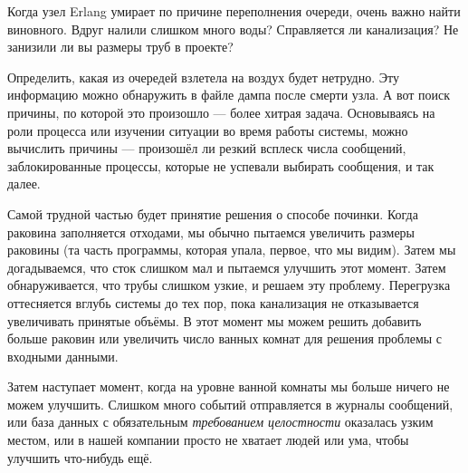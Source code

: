 \documentclass[11pt, oneside]{book}   	%
\begin{document}
Когда узел Erlang умирает по причине переполнения очереди, очень важно найти виновного. Вдруг налили слишком много воды? Справляется ли канализация? Не занизили ли вы размеры труб в проекте?

Определить, какая из очередей взлетела на воздух будет нетрудно. Эту информацию можно обнаружить в файле дампа после смерти узла. А вот поиск причины, по которой это произошло --- более хитрая задача. Основываясь на роли процесса или изучении ситуации во время работы системы, можно вычислить причины --- произошёл ли резкий всплеск числа сообщений, заблокированные процессы, которые не успевали выбирать сообщения, и так далее.

Самой трудной частью будет принятие решения о способе починки. Когда раковина заполняется отходами, мы обычно пытаемся увеличить размеры раковины (та часть программы, которая упала, первое, что мы видим). Затем мы догадываемся, что сток слишком мал и пытаемся улучшить этот момент. Затем обнаруживается, что трубы слишком узкие, и решаем эту проблему. Перегрузка оттесняется вглубь системы до тех пор, пока канализация не отказывается увеличивать принятые объёмы. В этот момент мы можем решить добавить больше раковин или увеличить число ванных комнат для решения проблемы с входными данными.

Затем наступает момент, когда на уровне ванной комнаты мы больше ничего не можем улучшить. Слишком много событий отправляется в журналы сообщений, или база данных с обязательным \emph{требованием целостности} оказалась узким местом, или в нашей компании просто не хватает людей или ума, чтобы улучшить что-нибудь ещё.
\end{document}
